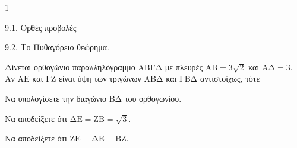 \begin{ylh}{1}
    \item 9.1. Ορθές προβολές
    \item 9.2. Το Πυθαγόρειο θεώρημα.
\end{ylh}
Δίνεται ορθογώνιο παραλληλόγραμμο $\mathrm{AB\Gamma\Delta}$ με πλευρές $\mathrm{AB}=3\sqrt{2}$ και $\mathrm{A\Delta}=3$. Αν $\mathrm{AE}$ και $\mathrm{\Gamma Z}$ είναι ύψη των τριγώνων $\mathrm{AB\Delta}$ και $\mathrm{\Gamma B\Delta}$ αντιστοίχως, τότε
\begin{alist}
\item Να υπολογίσετε την διαγώνιο $\mathrm{B\Delta}$ του ορθογωνίου. 
\item Να αποδείξετε ότι $\mathrm{\Delta E} = \mathrm{ZB} = \sqrt{3}$. 
\item Να αποδείξετε ότι $\mathrm{ZE} = \mathrm{\Delta E} = \mathrm{BZ}$. 
\end{alist}